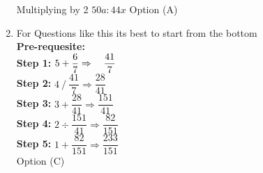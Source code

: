 \begin{multicols}{2}
\begin{enumerate}[label={\arabic*.}]
    Multiplying by 2 \hspace{10px} \(50a : 44x\) \hspace{5px}Option (A)
    \[\]
    \item For Questions like this its best to start from the bottom \\
    \textbf{Pre-requesite:} \\
     \textbf{Step 1:} \hspace{10px}\( 5 + \dfrac{6}{7} \Rightarrow \hspace{10px} \dfrac{41}{7}\) \vspace{5px} \\
     \textbf{Step 2:} \hspace{10px}\(4 \mathbin{/} \dfrac{41}{7} \Rightarrow \dfrac{28}{41}  \) \vspace{5px} \\
     \textbf{Step 3:} \hspace{10px}\(3 + \dfrac{28}{41} \Rightarrow \dfrac{151}{41}\) \vspace{5px}\\
     \textbf{Step 4:} \hspace{10px}\(2 ÷ \dfrac{151}{41} \Rightarrow \dfrac{82}{151}\) \vspace{5px} \\
     \textbf{Step 5:} \hspace{10px} \( 1 + \dfrac{82}{151} \Rightarrow \dfrac{233}{151}\) \\
    Option (C) 
    

\end{enumerate}
\end{multicols}
